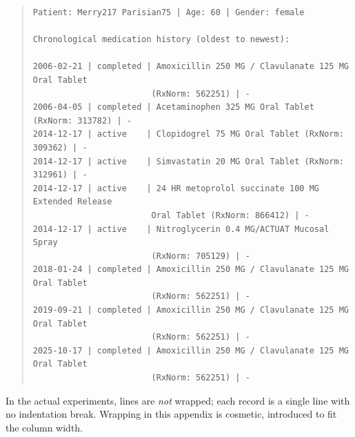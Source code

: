 \begin{quote}
\scriptsize
\begin{verbatim}
Patient: Merry217 Parisian75 | Age: 60 | Gender: female

Chronological medication history (oldest to newest):

2006-02-21 | completed | Amoxicillin 250 MG / Clavulanate 125 MG Oral Tablet
                        (RxNorm: 562251) | -
2006-04-05 | completed | Acetaminophen 325 MG Oral Tablet (RxNorm: 313782) | -
2014-12-17 | active    | Clopidogrel 75 MG Oral Tablet (RxNorm: 309362) | -
2014-12-17 | active    | Simvastatin 20 MG Oral Tablet (RxNorm: 312961) | -
2014-12-17 | active    | 24 HR metoprolol succinate 100 MG Extended Release
                        Oral Tablet (RxNorm: 866412) | -
2014-12-17 | active    | Nitroglycerin 0.4 MG/ACTUAT Mucosal Spray
                        (RxNorm: 705129) | -
2018-01-24 | completed | Amoxicillin 250 MG / Clavulanate 125 MG Oral Tablet
                        (RxNorm: 562251) | -
2019-09-21 | completed | Amoxicillin 250 MG / Clavulanate 125 MG Oral Tablet
                        (RxNorm: 562251) | -
2025-10-17 | completed | Amoxicillin 250 MG / Clavulanate 125 MG Oral Tablet
                        (RxNorm: 562251) | -
\end{verbatim}
\end{quote}

\noindent
In the actual experiments, lines are \textit{not} wrapped; each record is a single
line with no indentation break. Wrapping in this appendix is cosmetic, introduced
to fit the column width.
